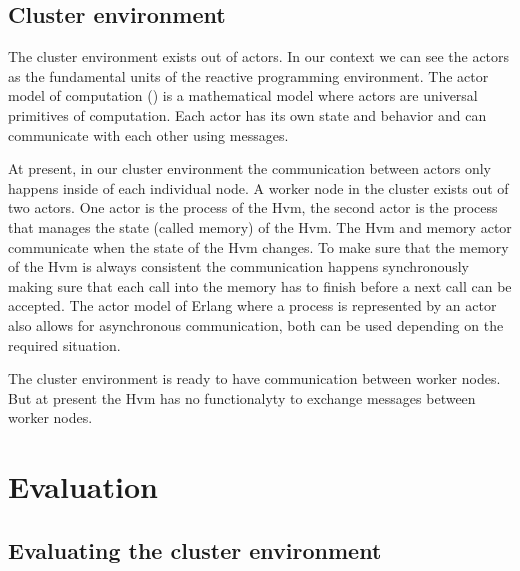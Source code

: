 \documentclass[a4paper]{book}
\begin{document}
\section{Cluster environment}
The cluster environment exists out of actors. In our context we can see the actors as the fundamental units of the reactive programming environment. The actor model of computation (\cite{hewitt:hal-01163534}) is a mathematical model where actors are universal primitives of computation. Each actor has its own state and behavior and can communicate with each other using messages. 

At present, in our cluster environment the communication between actors only happens inside of each individual node. A worker node in the cluster exists out of two actors. One actor is the process of the Hvm, the second actor is the process that manages the state (called memory) of the Hvm. The Hvm and memory actor communicate when the state of the Hvm changes. To make sure that the memory of the Hvm is always consistent the communication happens synchronously making sure that each call into the memory has to finish before a next call can be accepted. The actor model of Erlang where a process is represented by an actor also allows for asynchronous communication, both can be used depending on the required situation. 

The cluster environment is ready to have communication between worker nodes. But at present the Hvm has no functionalyty to exchange messages between worker nodes. 



\chapter{Evaluation} \label{sec:evaluation}


\section{Evaluating the cluster environment}
\end{document}
